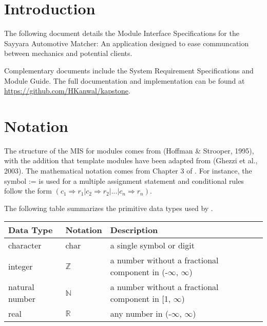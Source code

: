 \documentclass[12pt, titlepage]{article}
\begin{document}
\newpage

\tableofcontents

\newpage


\section{Introduction}

The following document details the Module Interface Specifications for
the Sayyara Automotive Matcher: An application designed to ease communcation between mechanics and potential clients.

Complementary documents include the System Requirement Specifications
and Module Guide.  The full documentation and implementation can be
found at \url{https://github.com/HKanwal/kapstone}. 

\section{Notation}


The structure of the MIS for modules comes from  (Hoffman & Strooper, 1995),
with the addition that template modules have been adapted from
 (Ghezzi et al., 2003).  The mathematical notation comes from Chapter 3 of
.  For instance, the symbol := is used for a
multiple assignment statement and conditional rules follow the form $(c_1
\Rightarrow r_1 | c_2 \Rightarrow r_2 | ... | c_n \Rightarrow r_n )$.

The following table summarizes the primitive data types used by \progname. 

\begin{center}
\renewcommand{\arraystretch}{1.2}
\noindent 
\begin{tabular}{l l p{7.5cm}} 
\toprule 
\textbf{Data Type} & \textbf{Notation} & \textbf{Description}\\ 
\midrule
character & char & a single symbol or digit\\
integer & $\mathbb{Z}$ & a number without a fractional component in (-$\infty$, $\infty$) \\
natural number & $\mathbb{N}$ & a number without a fractional component in [1, $\infty$) \\
real & $\mathbb{R}$ & any number in (-$\infty$, $\infty$)\\
\bottomrule
\end{tabular} 
\end{center}
\end{document}
